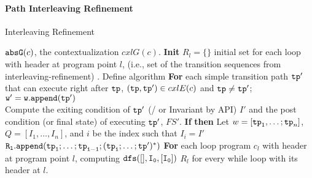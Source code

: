 \paragraph{Path Interleaving Refinement}
\begin{algorithm}
  \caption{
  {Interleaving Refinement}
  \label{alg:prog-refine}
  }
  \begin{algorithmic}[1]
  \REQUIRE $\mathtt{abs}{\mathtt{G}}(c)$, the contextualization $cxlG(c)$.
  \STATE  \textbf{Init} 
  $R_l = \{\}$ initial set for each loop with header at program point $l$, (i.e., set of the transition sequences from interleaving-refinement) .
  \STATE Define algorithm 
  \STATE {}
  \STATE \quad \textbf{For} each simple transition path $\mathtt{tp}'$ that can execute right after $\mathtt{tp}$,
  $(\mathtt{tp}, \mathtt{tp}') \in cxlE(c)$ and $\mathtt{tp} \neq \mathtt{tp}'$;
  \\
  \STATE \quad \quad $\mathtt{w' = w.append(\mathtt{tp}')}$
  \\
  \quad \quad {}
  \STATE  \quad \quad Compute the exiting condition of $\mathtt{tp}'$ (/ or Invariant by  API) $I'$ and the 
  post condition (or final state) of executing $\mathtt{tp}'$, $FS'$.
  \STATE \quad \quad \textbf{If} 
  \STATE \quad \quad \textbf{then}
  Let $w = [\mathtt{tp}_1, \ldots; \mathtt{tp}_n]$, $Q = [I_1, \ldots, I_n]$, and $i$ be the index such that $I_i = I'$
  \\ \quad \quad \quad \quad \quad
  $\mathtt{R_l.append(\mathtt{tp}_1; \ldots; \mathtt{tp}_{i - 1}; (\mathtt{tp}_i; \ldots; \mathtt{tp}')^*)}$
  \STATE \quad \quad  {}
    \STATE \textbf{For} each loop program $c_{l}$ with header at program point $l$, 
    \STATE \quad {}
    \STATE \quad computing $\mathtt{dfs([], I_0, [I_0] )}$
  \RETURN $R_l$ for every while loop with its header at $l$.
  \end{algorithmic}
  \end{algorithm}

